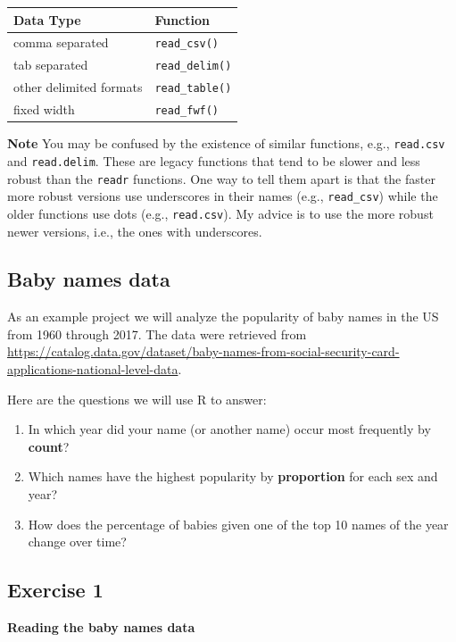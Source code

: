 \documentclass[
]{book}
\providecommand{\tightlist}{%
  \setlength{\itemsep}{0pt}\setlength{\parskip}{0pt}}
\begin{document}
\begin{longtable}[]{@{}ll@{}}
\toprule
Data Type & Function\tabularnewline
\midrule
\endhead
comma separated & \texttt{read\_csv()}\tabularnewline
tab separated & \texttt{read\_delim()}\tabularnewline
other delimited formats & \texttt{read\_table()}\tabularnewline
fixed width & \texttt{read\_fwf()}\tabularnewline
\bottomrule
\end{longtable}

\textbf{Note} You may be confused by the existence of similar functions,
e.g., \texttt{read.csv} and \texttt{read.delim}. These are legacy functions that
tend to be slower and less robust than the \texttt{readr} functions. One way
to tell them apart is that the faster more robust versions use
underscores in their names (e.g., \texttt{read\_csv}) while the older
functions use dots (e.g., \texttt{read.csv}). My advice is to use the more
robust newer versions, i.e., the ones with underscores.

\hypertarget{baby-names-data}{%
\subsection{Baby names data}\label{baby-names-data}}

As an example project we will analyze the popularity of baby names in the US from 1960 through 2017. The data were retrieved from
\url{https://catalog.data.gov/dataset/baby-names-from-social-security-card-applications-national-level-data}.

Here are the questions we will use R to answer:

\begin{enumerate}
\def\labelenumi{\arabic{enumi}.}
\tightlist
\item
  In which year did your name (or another name) occur most frequently by \textbf{count}?
\item
  Which names have the highest popularity by \textbf{proportion} for each sex and year?
\item
  How does the percentage of babies given one of the top 10 names of the year change over time?
\end{enumerate}

\hypertarget{exercise-1}{%
\subsection{Exercise 1}\label{exercise-1}}

\textbf{Reading the baby names data}
\end{document}
